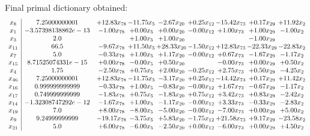 \documentclass[8pt]{article}
\begin{document}
 Final primal dictionary obtained: 
\[\begin{array}{c| c c@{\hskip 2pt} c@{\hskip 2pt} c@{\hskip 2pt} c@{\hskip 2pt} c@{\hskip 2pt} c@{\hskip 2pt} c@{\hskip 2pt} }
 x_{8}   &  7.25000000001 & + 12.83 x_{78} & -11.75 x_{5} & -2.67 x_{20} & +  0.25 x_{12} & -15.42 x_{73} & +  0.17 x_{29} & + 11.92 x_{2}\\
 x_{1}   &  -3.57398138862e-13 & -1.00 x_{78} & +  0.00 x_{5} & +  0.00 x_{20} & -0.00 x_{12} & +  1.00 x_{73} & +  1.00 x_{29} & -1.00 x_{2}\\
 x_{3}   &  2.0  &   & +  1.00 x_{5} & +  1.00 x_{20} &    &   & -1.00 x_{29} &   \\
 x_{11}   &  66.5 & -9.67 x_{78} & + 11.50 x_{5} & + 28.33 x_{20} & -1.50 x_{12} & + 12.83 x_{73} & -22.33 x_{29} & -22.83 x_{2}\\
 x_{7}   &  5.0 & -0.33 x_{78} & +  1.00 x_{5} & +  1.17 x_{20} & -0.00 x_{12} & +  0.67 x_{73} & -1.67 x_{29} & -1.17 x_{2}\\
 x_{15}   &  8.71525074331e-15 & +  0.00 x_{78} & -0.00 x_{5} & +  0.50 x_{20} &   & -0.00 x_{73} & +  0.00 x_{29} & +  0.50 x_{2}\\
 x_{4}   &  1.75 & -2.50 x_{78} & +  0.75 x_{5} & +  2.00 x_{20} & -0.25 x_{12} & +  2.75 x_{73} & +  0.50 x_{29} & -4.25 x_{2}\\
 x_{46}   &  7.25000000001 & + 12.83 x_{78} & -11.75 x_{5} & -3.17 x_{20} & +  0.25 x_{12} & -14.42 x_{73} & +  0.17 x_{29} & + 11.42 x_{2}\\
 x_{16}   &  0.999999999999 & -0.33 x_{78} & +  1.00 x_{5} & -0.83 x_{20} & -0.00 x_{12} & +  1.67 x_{73} & -0.67 x_{29} & -1.17 x_{2}\\
 x_{17}   &  0.749999999999 & -1.83 x_{78} & +  0.75 x_{5} & -1.83 x_{20} & +  0.75 x_{12} & +  3.42 x_{73} & +  0.83 x_{29} & -2.42 x_{2}\\
 x_{14}   &  -1.32308747292e-12 & -1.67 x_{78} & +  1.00 x_{5} & -1.17 x_{20} & -0.00 x_{12} & +  3.33 x_{73} & -0.33 x_{29} & -2.83 x_{2}\\
 x_{19}   &  7.0 & +  8.00 x_{78} & -8.00 x_{5} & -5.00 x_{20} & -0.00 x_{12} & -7.00 x_{73} & +  0.00 x_{29} & +  5.00 x_{2}\\
 x_{9}   &  9.24999999999 & -19.17 x_{78} & -3.75 x_{5} & +  5.83 x_{20} & -1.75 x_{12} & + 21.58 x_{73} & +  9.17 x_{29} & -23.58 x_{2}\\
 x_{21}   &  5.0 & +  6.00 x_{78} & -6.00 x_{5} & -2.50 x_{20} & +  0.00 x_{12} & -6.00 x_{73} & +  0.00 x_{29} & +  4.50 x_{2}\\

\end{array}\]
\end{document}
